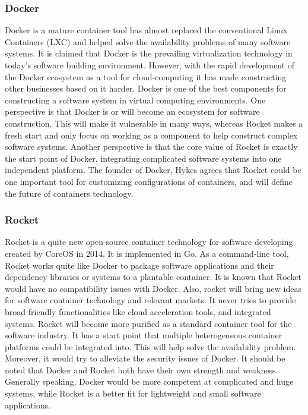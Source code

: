 \documentclass[letterpaper,10pt]{article}
\begin{document}
		\subsubsection{Docker}
    Docker is a mature container tool has almost replaced the conventional Linux Containers (LXC) and helped solve the availability problems of many software systems. It is claimed that Docker is the prevailing virtualization technology in today’s software building environment. However, with the rapid development of the Docker ecosystem as a tool for cloud-computing it has made constructing other businesses based on it harder.
Docker is one of the best components for constructing a software system in virtual computing environments. One perspective is that Docker is or will become an ecosystem for software construction. This will make it vulnerable in many ways, whereas Rocket makes a fresh start and only focus on working as a component to help construct complex software systems. Another perspective is that the core value of Rocket is exactly the start point of Docker, integrating complicated software systems into one independent platform. The founder of Docker, Hykes agrees that Rocket could be one important tool for customizing configurations of containers, and will define the future of containers technology.


		\subsubsection{Rocket}
    Rocket is a quite new open-source container technology for software developing created by CoreOS in 2014. It is implemented in Go. As a command-line tool, Rocket works quite like Docker to package software applications and their dependency libraries or systems to a plantable container. It is known that Rocket would have no compatibility issues with Docker. Also, rocket will bring new ideas for software container technology and relevant markets. It never tries to provide broad friendly functionalities like cloud acceleration tools, and integrated systems. Rocket will become more purified as a standard container tool for the software industry. It has a start point that multiple heterogeneous container platforms could be integrated into. This will help solve the availability problem. Moreover, it would try to alleviate the security issues of Docker. It should be noted that Docker and Rocket both have their own strength and weakness. Generally speaking, Docker would be more competent at complicated and huge systems, while Rocket is a better fit for lightweight and small software applications.
\end{document}

